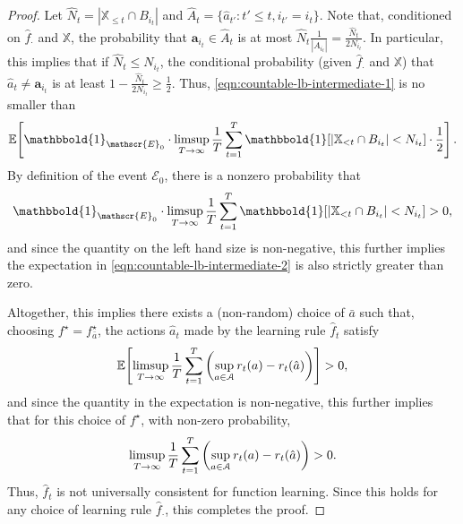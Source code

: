 \documentclass[aos]{imsart}
\theoremstyle{plain}
\theoremstyle{remark}
\newcommand{\Xbb}{\mathbb{X}}
\newcommand{\1}{\mathbbm{1}}%
\newcommand{\Event}{\mathscr{E}}
\newcommand{\A}{\mathcal A}
\newcommand{\E}{\mathbb E}
\renewcommand{\limsup}{\mathop{\rm limsup}}
\newcommand{\ind}{\mathbbold{1}}
\newcommand{\ProcX}{\mathbb{X}}
\newcommand{\target}{f^{\star}}
\begin{document}
\begin{proof}
Let $\hat{N}_{t} = | \Xbb_{\leq t} \cap B_{i_t} |$ and 
$\hat{A}_{t} = \{ \hat{a}_{t'} : t' \leq t, i_{t'} = i_{t} \}$.
Note that, conditioned on 
$\hat{f}_{\cdot}$ and $\ProcX$, 
the probability that 
$\mathbf{a}_{i_t} \in \hat{A}_{t}$ is 
at most $\hat{N}_{t} \frac{1}{|A_{i_t}|} = \frac{\hat{N}_{t}}{2N_{i_t}}$.
In particular, this implies that 
if $\hat{N}_t \leq N_{i_t}$, 
the conditional probability (given $\hat{f}_{\cdot}$ and $\ProcX$)  that $\hat{a}_{t} \neq \mathbf{a}_{i_t}$ 
is at least $1 - \frac{\hat{N}_{t}}{2N_{i_t}} \geq \frac{1}{2}$.
Thus, \eqref{eqn:countable-lb-intermediate-1} 
is no smaller than 
\begin{equation}
\label{eqn:countable-lb-intermediate-2}
\E\!\left[ \ind_{\Event_0} \cdot \limsup_{T \to \infty} \frac{1}{T} \sum_{t=1}^{T} \ind\!\left[ | \Xbb_{< t} \cap B_{i_t}| < N_{i_t} \right] \cdot \frac{1}{2} \right].
\end{equation}
By definition of the event $\Event_0$, 
there is a nonzero probability that 
\begin{equation*}
\ind_{\Event_0} \cdot \limsup_{T \to \infty} \frac{1}{T} \sum_{t=1}^{T} \ind\!\left[ | \Xbb_{< t} \cap B_{i_t}| < N_{i_t} \right] > 0,
\end{equation*}
and since the quantity on the left hand size is non-negative, 
this further implies the expectation in \eqref{eqn:countable-lb-intermediate-2}
is also strictly greater than zero.

Altogether, this implies there exists a (non-random) choice of $\bar{a}$ 
such that, choosing $\target = \target_{\bar{a}}$, 
the actions $\hat{a}_t$ made by the 
learning rule $\hat{f}_{t}$ satisfy 
\begin{equation*}
\E\!\left[ \limsup_{T \to \infty} \frac{1}{T} \sum_{t=1}^{T} \left( \sup_{a \in \A} r_{t}(a) - r_{t}(\hat{a}) \right) \right] > 0,
\end{equation*}
and since the quantity in the expectation 
is non-negative, this further implies 
that for this choice of $\target$, 
with non-zero probability, 
\begin{equation*}
\limsup_{T \to \infty} \frac{1}{T} \sum_{t=1}^{T} \left( \sup_{a \in \A} r_{t}(a) - r_{t}(\hat{a}) \right) > 0.
\end{equation*}
Thus, $\hat{f}_t$ is not 
universally consistent for 
function learning.  Since this holds 
for any choice of learning rule $\hat{f}_{\cdot}$, this completes the proof.
\end{proof}
\end{document}
